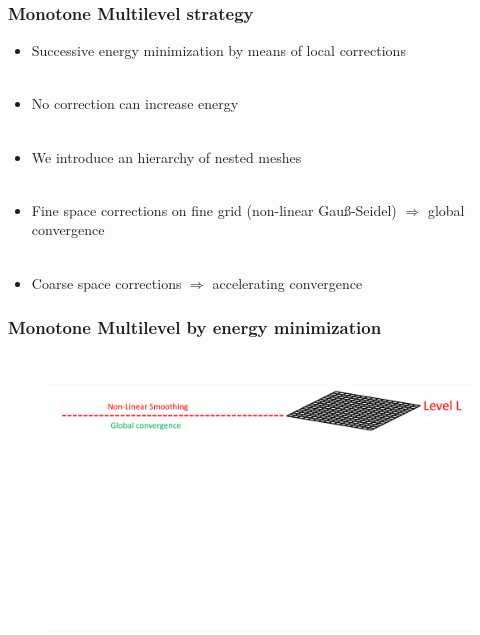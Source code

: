 \documentclass[8pt, oneside]{beamer}   	%
\newcommand{\titlecolor}[1]{\frametitle{\textcolor{dkgrey}{ \textbf{#1}}}}
\begin{document}
\begin{frame}
\titlecolor{Monotone Multilevel strategy}
\begin{itemize}
\item Successive energy minimization by means of local corrections
\\${}$\\
\item No correction can increase energy
\\${}$\\
\item We introduce an hierarchy of nested meshes\\${}$\\
\item Fine space corrections on fine grid (non-linear Gau{\ss}-Seidel) $\Rightarrow$ global convergence
\\${}$\\
\item Coarse space corrections $\Rightarrow$ accelerating convergence
\end{itemize}

\end{frame}




\begin{frame}
\titlecolor{Monotone Multilevel by energy minimization}
${}$
\begin{figure}[htbp!]
		\centering
	\includegraphics[width=1\textwidth]{img/multigridexplained1.pdf}
\end{figure}
\end{frame}
\end{document}
